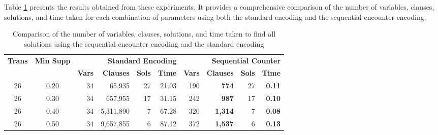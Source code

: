 Table \ref{tab:4_1} presents the results obtained from these experiments.
It provides a comprehensive comparison of the number of variables, clauses, solutions, and time taken for each combination of parameters using both the standard encoding and the sequential encounter encoding.
\begin{table}[H]
    \centering
    \caption{Comparison of the number of variables, clauses, solutions, and time taken to find all solutions using the sequential encounter encoding and the standard encoding}
    \label{tab:4_1}
    \begin{tabular}{|c|c|r|r|r|r|r|r|r|r|}
        \hline
        \multirow{2}{*}{\textbf{Trans}} & \multirow{2}{*}{\textbf{Min Supp}} & \multicolumn{4}{r|}{\textbf{Standard Encoding}} & \multicolumn{4}{r|}{\textbf{Sequential Counter}}                                                                                                    \\ \cline{3-10}
                                        &                                    & \textbf{Vars}                                   & \textbf{Clauses}                                 & \textbf{Sols} & \textbf{Time} & \textbf{Vars} & \textbf{Clauses} & \textbf{Sols} & \textbf{Time} \\ \hline
        26                              & 0.20                               & 34                                              & 65,935                                           & 27            & 21.03         & 190           & \textbf{ 774}    & 27            & \textbf{0.11} \\ \hline
        26                              & 0.30                               & 34                                              & 657,955                                          & 17            & 31.15         & 242           & \textbf{ 987}    & 17            & \textbf{0.10} \\ \hline
        26                              & 0.40                               & 34                                              & 5,311,890                                        & 7             & 67.28         & 320           & \textbf{1,314}   & 7             & \textbf{0.08} \\ \hline
        26                              & 0.50                               & 34                                              & 9,657,855                                        & 6             & 87.12         & 372           & \textbf{1,537}   & 6             & \textbf{0.13} \\ \hline

\end{tabular}
\end{table}
